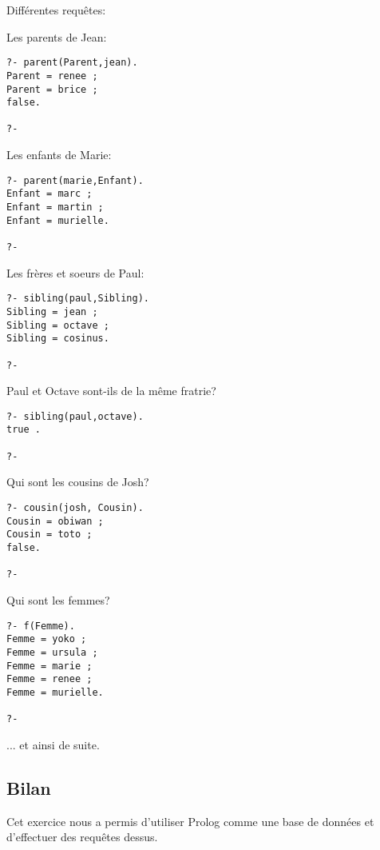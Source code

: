 Différentes requêtes:
\begin{description}
    \item Les parents de Jean:\\
\begin{verbatim}
?- parent(Parent,jean).
Parent = renee ;
Parent = brice ;
false.

?-
\end{verbatim}
    \item Les enfants de Marie:\\
\begin{verbatim}
?- parent(marie,Enfant).
Enfant = marc ;
Enfant = martin ;
Enfant = murielle.

?- 
\end{verbatim}
    \item Les frères et soeurs de Paul:\\
\begin{verbatim}
?- sibling(paul,Sibling).
Sibling = jean ;
Sibling = octave ;
Sibling = cosinus.

?-
\end{verbatim}
    \item Paul et Octave sont-ils de la même fratrie?\\
\begin{verbatim}
?- sibling(paul,octave).
true .

?-
\end{verbatim}
    \item Qui sont les cousins de Josh?\\
\begin{verbatim}
?- cousin(josh, Cousin).
Cousin = obiwan ;
Cousin = toto ;
false.

?-
\end{verbatim}
    \item Qui sont les femmes?\\  
\begin{verbatim}
?- f(Femme).
Femme = yoko ;
Femme = ursula ;
Femme = marie ;
Femme = renee ;
Femme = murielle.

?-
\end{verbatim}
\end{description}    
... et ainsi de suite.
    \subsection{Bilan}
        Cet exercice nous a permis d'utiliser Prolog comme une base de
données et d'effectuer des requêtes dessus.

